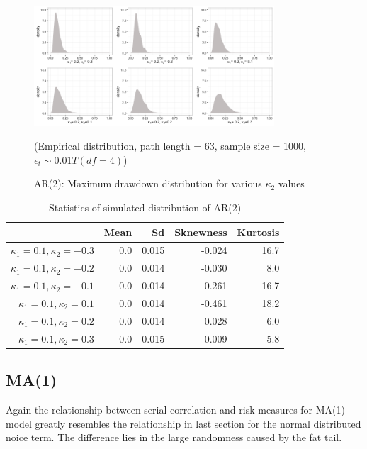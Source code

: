 \documentclass[11pt]{article}
\begin{document}
\begin{figure}[H]
\centering
\includegraphics[width = 0.8\textwidth]{../figures/simulation/T_dist_AR2_maxDrawdown_dist_kappa1_02}
\caption{AR(2): Maximum drawdown distribution for various $\kappa_2$ values }
(Empirical distribution, path length = 63, sample size = 1000, $\epsilon_t \sim 0.01T(df = 4)$)
\label{fig:T_dist_AR2_maxDrawdown_dist_kappa1_02}
\end{figure}

\begin{table}[H]
\centering
\begin{tabular}{|r |r r r r|}
\hline
& Mean & Sd & Sknewness & Kurtosis \\
\hline
$\kappa_1 = 0.1, \kappa_2 = -0.3$ & 0.0 & 0.015 & -0.024 & 16.7\\
$\kappa_1 = 0.1, \kappa_2 = -0.2$ & 0.0 & 0.014 & -0.030 & 8.0\\
$\kappa_1 = 0.1, \kappa_2 = -0.1$ & 0.0 & 0.014 & -0.261 & 16.7\\
$\kappa_1 = 0.1, \kappa_2 = 0.1$ & 0.0 & 0.014 & -0.461 & 18.2\\
$\kappa_1 = 0.1, \kappa_2 = 0.2$ & 0.0 & 0.014 & 0.028 & 6.0\\
$\kappa_1 = 0.1, \kappa_2 = 0.3$ & 0.0 & 0.015 & -0.009 & 5.8\\
\hline
\end{tabular}
\caption{Statistics of simulated distribution of AR(2)}
\label{table: T_dist_AR2_return}
\end{table}

\subsection{MA(1)}

Again the relationship between serial correlation and risk measures for MA(1) model greatly resembles the relationship in last section for the normal distributed noice term. The difference lies in the large randomness caused by the fat tail. 
\end{document}
